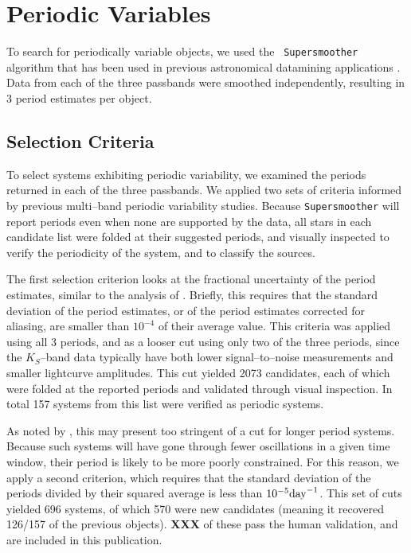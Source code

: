 \documentclass[]{emulateapj}
\begin{document}
\section{Periodic Variables}

To search for periodically variable objects, we used the {\tt
  Supersmoother} algorithm that has been used in previous astronomical
datamining applications \citep[e.g.][]{2011ApJ...731...17B}.  Data
from each of the three passbands were smoothed independently,
resulting in 3 period estimates per object.


\subsection{Selection Criteria}
To select systems exhibiting periodic variability, we examined the
periods returned in each of the three passbands.  We applied two sets
of criteria informed by previous multi--band periodic variability
studies.  Because {\tt Supersmoother} will report periods even when
none are supported by the data, all stars in each candidate list were
folded at their suggested periods, and visually inspected to verify
the periodicity of the system, and to classify the sources.

The first selection criterion looks at the fractional uncertainty of
the period estimates, similar to the analysis of
\cite{2011ApJ...731...17B}.  Briefly, this requires that the standard
deviation of the period estimates, or of the period estimates
corrected for aliasing, are smaller than $10^{-4}$ of their average
value. This criteria was applied using all 3 periods, and as a looser
cut using only two of the three periods, since the $K_S$--band data
typically have both lower signal--to--noise measurements and smaller
lightcurve amplitudes.  This cut yielded 2073 candidates, each of
which were folded at the reported periods and validated through visual
inspection.  In total 157 systems from this list were verified as
periodic systems.

As noted by \cite{2012AJ....144....9O}, this may present too stringent
of a cut for longer period systems.  Because such systems will have
gone through fewer oscillations in a given time window, their period
is likely to be more poorly constrained.  For this reason, we apply a
second criterion, which requires that the standard deviation of the
periods divided by their squared average is less than $10^{-5} {\rm
  day}^{-1}$.  This set of cuts yielded 696 systems, of which 570 were
new candidates (meaning it recovered 126/157 of the previous objects).
{\bf XXX} of these pass the human validation, and are included in this
publication.
\end{document}
